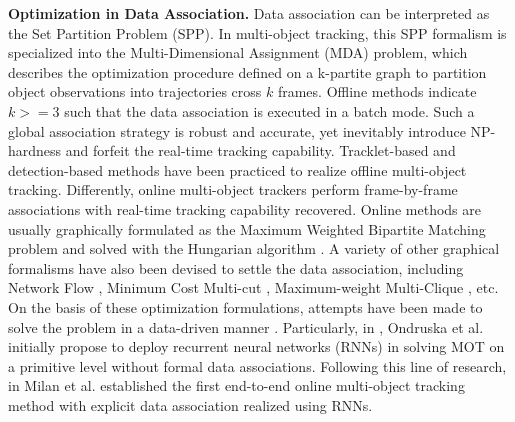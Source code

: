 \documentclass[10pt,twocolumn,letterpaper]{article}
\begin{document}
\textbf{Optimization in Data Association.} Data association can be interpreted as the Set Partition Problem (SPP)\cite{SPP}. In multi-object tracking, this SPP formalism is specialized into the Multi-Dimensional Assignment (MDA) problem, which describes the optimization procedure defined on a k-partite graph to partition object observations into trajectories cross $k$ frames. Offline methods indicate $k>=3$ such that the data association is executed in a batch mode. Such a global association strategy is robust and accurate, yet inevitably introduce NP-hardness and forfeit the real-time tracking capability. Tracklet-based \cite{TrackletsBasedECCV2008, SOTMOT, ECCV18YangMHDualAttention, SOTMOT2} and detection-based \cite{MilanEnergy, NevatiaCVPR2008} methods have been practiced to realize offline multi-object tracking. Differently, online multi-object trackers \cite{BM1WACV2014, BM2ShahCVPR2012, OnlineMOTCVPR2014} perform frame-by-frame associations with real-time tracking capability recovered. Online methods are usually graphically formulated as the Maximum Weighted Bipartite Matching \cite{DLGraphMatching} problem and solved with the Hungarian algorithm \cite{Hungarian}. A variety of other graphical formalisms have also been devised to settle the data association, including Network Flow \cite{ShahNF,PAMI16NF,NF2CVPR2011, DeepNF}, Minimum Cost Multi-cut \cite{Multicut2015CVPR, MulticutECCV2016, MulticutTang2017}, Maximum-weight Multi-Clique \cite{ShahGMMCP2015CVPR}, etc. On the basis of these optimization formulations, attempts have been made to solve the problem in a data-driven manner \cite{DeepNF, DLGraphMatching}. Particularly, in \cite{DeepTracking, ondruska2}, Ondruska et al. initially propose to deploy recurrent neural networks (RNNs) in solving MOT on a primitive level without formal data associations. Following this line of research, in \cite{Milan2017AAAI} Milan et al. established the first end-to-end online multi-object tracking method with explicit data association realized using RNNs.
\end{document}
